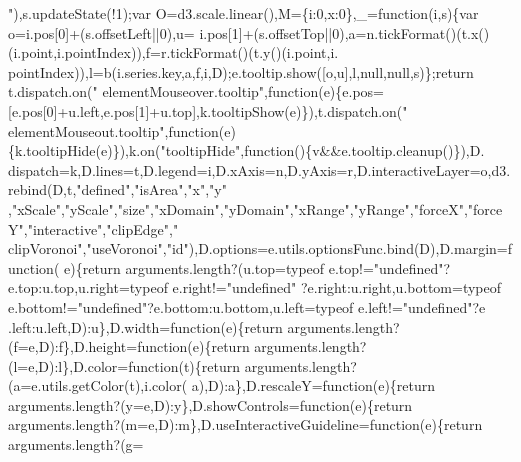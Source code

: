\begin{DoxyCode}
{      "}),s.updateState(!1);var O=d3.scale.linear(),M=\{i:0,x:0\},\_=\textcolor{keyword}{function}(i,s)\{var o=i.pos[0]+(s.offsetLeft||0),u=
      i.pos[1]+(s.offsetTop||0),a=n.tickFormat()(t.x()(i.point,i.pointIndex)),f=r.tickFormat()(t.y()(i.point,i.
      pointIndex)),l=b(i.series.key,a,f,i,D);e.tooltip.show([o,u],l,null,null,s)\};\textcolor{keywordflow}{return} t.dispatch.on(\textcolor{stringliteral}{"
      elementMouseover.tooltip"},\textcolor{keyword}{function}(e)\{e.pos=[e.pos[0]+u.left,e.pos[1]+u.top],k.tooltipShow(e)\}),t.dispatch.on(\textcolor{stringliteral}{"
      elementMouseout.tooltip"},\textcolor{keyword}{function}(e)\{k.tooltipHide(e)\}),k.on(\textcolor{stringliteral}{"tooltipHide"},\textcolor{keyword}{function}()\{v&&e.tooltip.cleanup()\}),D.
      dispatch=k,D.lines=t,D.legend=i,D.xAxis=n,D.yAxis=r,D.interactiveLayer=o,d3.rebind(D,t,\textcolor{stringliteral}{"defined"},\textcolor{stringliteral}{"isArea"},\textcolor{stringliteral}{"x"},\textcolor{stringliteral}{"y"}
      ,\textcolor{stringliteral}{"xScale"},\textcolor{stringliteral}{"yScale"},\textcolor{stringliteral}{"size"},\textcolor{stringliteral}{"xDomain"},\textcolor{stringliteral}{"yDomain"},\textcolor{stringliteral}{"xRange"},\textcolor{stringliteral}{"yRange"},\textcolor{stringliteral}{"forceX"},\textcolor{stringliteral}{"forceY"},\textcolor{stringliteral}{"interactive"},\textcolor{stringliteral}{"clipEdge"},\textcolor{stringliteral}{"
      clipVoronoi"},\textcolor{stringliteral}{"useVoronoi"},\textcolor{stringliteral}{"id"}),D.options=e.utils.optionsFunc.bind(D),D.margin=\textcolor{keyword}{function}(
      e)\{\textcolor{keywordflow}{return} arguments.length?(u.top=typeof e.top!=\textcolor{stringliteral}{"undefined"}?e.top:u.top,u.right=typeof e.right!=\textcolor{stringliteral}{"undefined"}
      ?e.right:u.right,u.bottom=typeof e.bottom!=\textcolor{stringliteral}{"undefined"}?e.bottom:u.bottom,u.left=typeof e.left!=\textcolor{stringliteral}{"undefined"}?e
      .left:u.left,D):u\},D.width=\textcolor{keyword}{function}(e)\{\textcolor{keywordflow}{return} arguments.length?(f=e,D):f\},D.height=\textcolor{keyword}{function}(e)\{\textcolor{keywordflow}{return} 
      arguments.length?(l=e,D):l\},D.color=\textcolor{keyword}{function}(t)\{\textcolor{keywordflow}{return} arguments.length?(a=e.utils.getColor(t),i.color(
      a),D):a\},D.rescaleY=\textcolor{keyword}{function}(e)\{\textcolor{keywordflow}{return} arguments.length?(y=e,D):y\},D.showControls=\textcolor{keyword}{function}(e)\{\textcolor{keywordflow}{return} 
      arguments.length?(m=e,D):m\},D.useInteractiveGuideline=\textcolor{keyword}{function}(e)\{\textcolor{keywordflow}{return} arguments.length?(g=

\end{DoxyCode}
